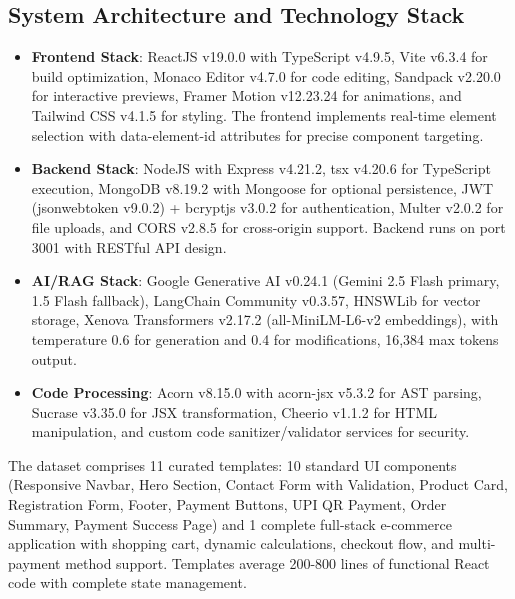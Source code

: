 \documentclass[10pt, conference, letterpaper]{IEEEtran}
\begin{document}
\subsection{System Architecture and Technology Stack}
\begin{itemize}
\item \textbf{Frontend Stack}: ReactJS v19.0.0 with TypeScript v4.9.5, Vite v6.3.4 for build optimization, Monaco Editor v4.7.0 for code editing, Sandpack v2.20.0 for interactive previews, Framer Motion v12.23.24 for animations, and Tailwind CSS v4.1.5 for styling. The frontend implements real-time element selection with data-element-id attributes for precise component targeting.
\item \textbf{Backend Stack}: NodeJS with Express v4.21.2, tsx v4.20.6 for TypeScript execution, MongoDB v8.19.2 with Mongoose for optional persistence, JWT (jsonwebtoken v9.0.2) + bcryptjs v3.0.2 for authentication, Multer v2.0.2 for file uploads, and CORS v2.8.5 for cross-origin support. Backend runs on port 3001 with RESTful API design.
\item \textbf{AI/RAG Stack}: Google Generative AI v0.24.1 (Gemini 2.5 Flash primary, 1.5 Flash fallback), LangChain Community v0.3.57, HNSWLib for vector storage, Xenova Transformers v2.17.2 (all-MiniLM-L6-v2 embeddings), with temperature 0.6 for generation and 0.4 for modifications, 16,384 max tokens output.
\item \textbf{Code Processing}: Acorn v8.15.0 with acorn-jsx v5.3.2 for AST parsing, Sucrase v3.35.0 for JSX transformation, Cheerio v1.1.2 for HTML manipulation, and custom code sanitizer/validator services for security.
\end{itemize}
The dataset comprises 11 curated templates: 10 standard UI components (Responsive Navbar, Hero Section, Contact Form with Validation, Product Card, Registration Form, Footer, Payment Buttons, UPI QR Payment, Order Summary, Payment Success Page) and 1 complete full-stack e-commerce application with shopping cart, dynamic calculations, checkout flow, and multi-payment method support. Templates average 200-800 lines of functional React code with complete state management.
\end{document}
